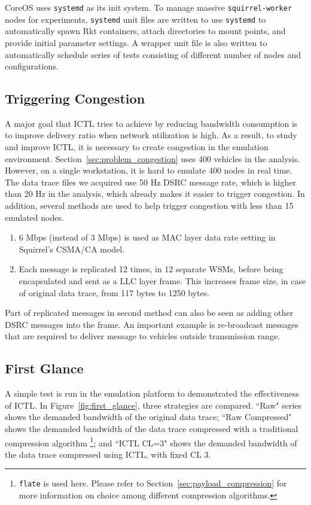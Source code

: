 \documentclass[12pt]{report}
\begin{document}
CoreOS uses \texttt{systemd} as its init system. To manage massive \texttt{squirrel-worker} nodes for experiments, \texttt{systemd} unit files are written to use \texttt{systemd} to automatically spawn Rkt containers, attach directories to mount points, and provide initial parameter settings. A wrapper unit file is also written to automatically schedule series of tests consisting of different number of nodes and configurations.

\subsection{Triggering Congestion}
\label{sec:trigger_congestion}

A major goal that ICTL tries to achieve by reducing bandwidth consumption is to improve delivery ratio when network utilization is high. As a result, to study and improve ICTL, it is necessary to create congestion in the emulation environment. Section~\ref{sec:problem_congestion} uses 400 vehicles in the analysis. However, on a single workstation, it is hard to emulate 400 nodes in real time. The data trace files we acquired use 50 Hz DSRC message rate, which is higher than 20 Hz in the analysis, which already makes it easier to trigger congestion. In addition, several methods are used to help trigger congestion with less than 15 emulated nodes.

\begin{enumerate}
  \item 6 Mbps (instead of 3 Mbps) is used as MAC layer data rate setting in Squirrel's CSMA/CA model.
  \item Each message is replicated 12 times, in 12 separate WSMs, before being encapsulated and sent as a LLC layer frame. This increases frame size, in case of original data trace, from 117 bytes to 1250 bytes.
\end{enumerate}

Part of replicated messages in second method can also be seen as adding other DSRC messages into the frame. An important example is re-broadcast messages that are required to deliver message to vehicles outside transmission range.


\subsection{First Glance}

A simple test is run in the emulation platform to demonstrated the effectiveness of ICTL. In Figure~\ref{fig:first_glance}, three strategies are compared. ``Raw" series shows the demanded bandwidth of the original data trace; ``Raw Compressed" shows the demanded bandwidth of the data trace compressed with a traditional compression algorithm \footnote{\texttt{flate} is used here. Please refer to Section~\ref{sec:payload_compression} for more information on choice among different compression algorithms.}; and ``ICTL CL=3" shows the demanded bandwidth of the data trace compressed using ICTL, with fixed CL 3.
\end{document}
